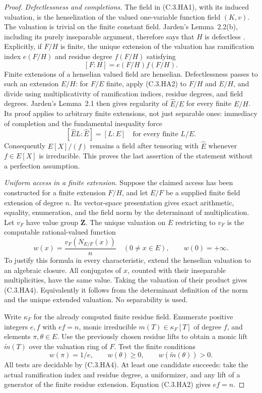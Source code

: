 \begin{proof}
\emph{Defectlessness and completions.}
The field in (C.3.HA1), with its induced
valuation, is the henselization of the
valued one-variable function field
$(K,v)$.  The valuation is trivial
on the finite constant field.
Jarden's Lemma~2.2(b), including its
purely inseparable argument, therefore
says that $H$ is defectless
\cite[Lemmas 2.1--2.2]{C-JardenHenselian1994}.
Explicitly, if $F/H$ is finite, the
unique extension of the valuation has
ramification index $e(F/H)$ and residue
degree $f(F/H)$ satisfying
\[
 [F:H]=e(F/H)f(F/H).                                     \tag{C.3.HA2}
\]
Finite extensions of a henselian valued
field are henselian.  Defectlessness
passes to such an extension $E/H$:
for $F/E$ finite, apply (C.3.HA2) to
$F/H$ and $E/H$, and divide using
multiplicativity of ramification
indices, residue degrees, and field
degrees.
Jarden's Lemma~2.1 then gives regularity
of $\widehat E/E$ for every finite
$E/H$.  Its proof applies to arbitrary
finite extensions, not just separable
ones: immediacy of completion and the
fundamental inequality force
\[
 [\widehat E L:\widehat E]=[L:E]
 \quad\text{for every finite }L/E.                     \tag{C.3.HA3}
\]
Consequently $E[X]/(f)$ remains a field
after tensoring with $\widehat E$
whenever $f\in E[X]$ is irreducible.
This proves the last assertion of the
statement without a perfection assumption.

\emph{Uniform access in a finite extension.}
Suppose the claimed access has been
constructed for a finite extension
$F/H$, and let $E/F$ be a supplied
finite field extension of degree $n$.
Its vector-space presentation gives
exact arithmetic, equality, enumeration,
and the field norm by the determinant
of multiplication.
Let $v_F$ have value group $\mathbf Z$.
The unique valuation on $E$ restricting
to $v_F$ is the computable rational-valued
function
\[
 w(x)=\frac{v_F(N_{E/F}(x))}{n}
       \quad (0\ne x\in E),\qquad w(0)=+\infty .        \tag{C.3.HA4}
\]
To justify this formula in every
characteristic, extend the henselian
valuation to an algebraic closure.
All conjugates of $x$, counted with
their inseparable multiplicities,
have the same value.  Taking the
valuation of their product gives
(C.3.HA4).  Equivalently it follows
from the determinant definition of
the norm and the unique extended
valuation.  No separability is used.

Write $\kappa_F$ for the already
computed finite residue field.
Enumerate positive integers $e,f$
with $ef=n$, monic irreducible
$m(T)\in\kappa_F[T]$ of degree $f$,
and elements $\pi,\theta\in E$.
Use the previously chosen residue
lifts to obtain a monic lift
$\widetilde m(T)$ over the valuation
ring of $F$.
Test the finite conditions
\[
 w(\pi)=1/e,\qquad w(\theta)\geq0,
       \qquad w(\widetilde m(\theta))>0.               \tag{C.3.HA5}
\]
All tests are decidable by (C.3.HA4).
At least one candidate succeeds:
take the actual ramification index
and residue degree, a uniformizer,
and any lift of a generator of the
finite residue extension.
Equation (C.3.HA2) gives $ef=n$.


\end{proof}
